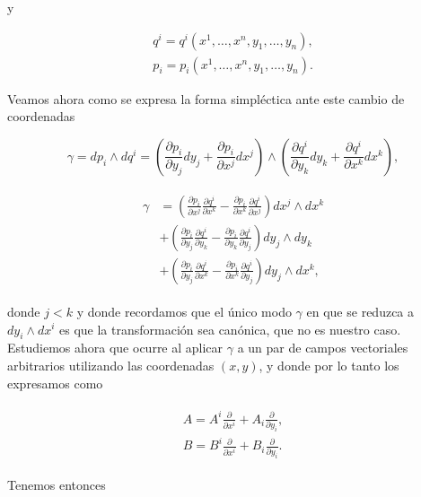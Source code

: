 \documentclass[a4paper,10pt]{article}
\numberwithin{equation}{section}
\begin{document}
y 

\begin{align}
 q^i = q^i(x^1,\dots,x^n,y_1,\dots,y_n), \\
 p_i = p_i(x^1,\dots,x^n,y_1,\dots,y_n).
\end{align}

Veamos ahora como se expresa la forma simpléctica ante este cambio de coordenadas

\begin{equation}
 \gamma = dp_i \wedge dq^i = \left(\frac{\partial p_i}{\partial y_j}dy_j + 
 \frac{\partial p_i}{\partial x^j}dx^j\right) \wedge 
 \left(\frac{\partial q^i}{\partial y_k}dy_k + 
 \frac{\partial q^i}{\partial x^k}dx^k\right),
\end{equation}

\begin{align}
\begin{split}
 \gamma &= \left(\frac{\partial p_i}{\partial x^j}\frac{\partial q^i}{\partial x^k} 
 - \frac{\partial p_i}{\partial x^k}\frac{\partial q^i}{\partial x^j}\right)dx^j \wedge dx^k \\
 &+ \left(\frac{\partial p_i}{\partial y_j}\frac{\partial q^i}{\partial y_k} 
 - \frac{\partial p_i}{\partial y_k}\frac{\partial q^i}{\partial y_j}\right)dy_j \wedge dy_k \\
 &+ \left(\frac{\partial p_i}{\partial y_j}\frac{\partial q^i}{\partial x^k} 
 - \frac{\partial p_i}{\partial x^k}\frac{\partial q^i}{\partial y_j}\right)dy_j \wedge dx^k,
\end{split}
\end{align}

donde $j < k$ y donde recordamos que el único modo $\gamma$ en que se reduzca 
a $dy_i \wedge dx^i$ es que la transformación sea canónica, que no es nuestro caso. Estudiemos 
ahora que ocurre al aplicar $\gamma$ a un par de campos vectoriales arbitrarios utilizando 
las coordenadas $(x,y)$, y donde por lo tanto los expresamos como 

\begin{align}
 \begin{split}
  A = A^i\frac{\partial}{\partial x^i} + A_i \frac{\partial}{\partial y_i}, \\
  B = B^i\frac{\partial}{\partial x^i} + B_i \frac{\partial}{\partial y_i}.
 \end{split}
\end{align}

Tenemos entonces 
\end{document}
